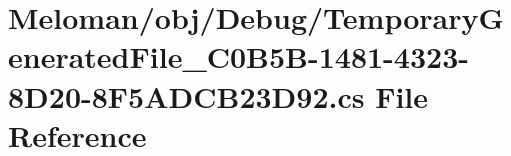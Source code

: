 \hypertarget{_temporary_generated_file__036_c0_b5_b-1481-4323-8_d20-8_f5_a_d_c_b23_d92_8cs}{}\section{Meloman/obj/\+Debug/\+Temporary\+Generated\+File\+\_\+C0\+B5\+B-\/1481-\/4323-\/8\+D20-\/8\+F5\+A\+D\+C\+B23\+D92.cs File Reference}
\label{_temporary_generated_file__036_c0_b5_b-1481-4323-8_d20-8_f5_a_d_c_b23_d92_8cs}

